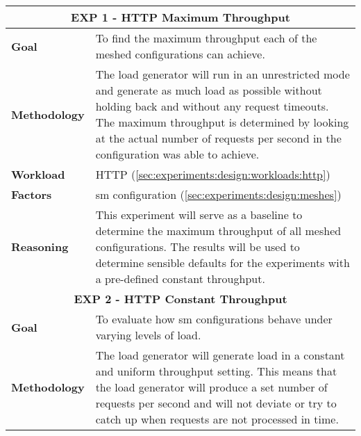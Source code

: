 \begin{table}[!t]
    \centering

    \begin{tabularx}{\textwidth}{l X}
    
        \toprule
        \multicolumn{2}{c}{\textbf{EXP 1 - HTTP Maximum Throughput}}  \\
        \toprule
        
        \textbf{Goal}
        & To find the maximum throughput each of the meshed configurations can achieve. \\
        \midrule
        
        \textbf{Methodology}
        & The load generator will run in an unrestricted mode and generate as much load as possible without holding back and without any request timeouts. The maximum throughput is determined by looking at the actual number of requests per second in the configuration was able to achieve. \\
        \midrule
        
        \textbf{Workload} 
        & HTTP (\cref{sec:experiments:design:workloads:http}) \\
        \midrule

        \multirow{1}{*}{\textbf{Factors}} 
        & \Gls{sm} configuration (\cref{sec:experiments:design:meshes}) \\
        \midrule
        
        \textbf{Reasoning}
        & This experiment will serve as a baseline to determine the maximum throughput of all meshed configurations. The results will be used to determine sensible defaults for the experiments with a pre-defined constant throughput. \\
        
        \toprule
        \multicolumn{2}{c}{\textbf{EXP 2 - HTTP Constant Throughput}}  \\
        \toprule
        
        \textbf{Goal}
        & To evaluate how \gls{sm} configurations behave under varying levels of load. \\
        \midrule
        
        \textbf{Methodology}
        & The load generator will generate load in a constant and uniform throughput setting. This means that the load generator will produce a set number of requests per second and will not deviate or try to catch up when requests are not processed in time.  \\
        \midrule
        

\end{tabularx}
\end{table}
